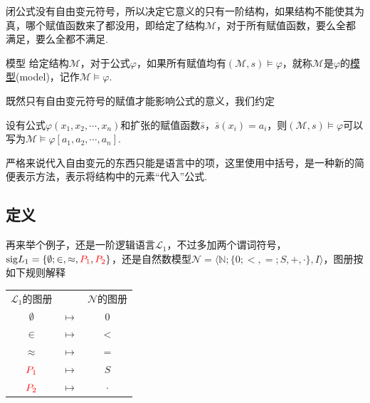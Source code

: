 闭公式没有自由变元符号，所以决定它意义的只有一阶结构，如果结构不能使其为真，哪个赋值函数来了都没用，即给定了结构\(\mathcal{M}\)，对于所有赋值函数，要么全都满足，要么全都不满足.

\begin{definition}{模型}
    给定结构\(\mathcal{M}\)，对于公式\(\varphi\)，如果所有赋值均有\((\mathcal{M}, s) \vDash \varphi\)，就称\(\mathcal{M}\)是\(\varphi\)的\underline{模型}(model)，记作\(\mathcal{M} \vDash \varphi\). 
\end{definition}

既然只有自由变元符号的赋值才能影响公式的意义，我们约定
\begin{reference}
    设有公式\(\varphi(x_1,x_2,\cdots,x_n)\)和扩张的赋值函数\(\bar s\)，\(\bar s(x_i)=a_i\)，则\((\mathcal{M},s) \vDash \varphi\)可以写为\(\mathcal{M} \vDash \varphi[a_1,a_2,\cdots,a_n]\).
\end{reference}
严格来说代入自由变元的东西只能是语言中的项，这里使用中括号，是一种新的简便表示方法，表示将结构中的元素“代入”公式. 

\subsection{定义}

再来举个例子，还是一阶逻辑语言\(\mathcal{L_1}\)，不过多加两个谓词符号，\({\rm sig}L_1 = \{\emptyset; \in, \approx, {\color{red}P_1}, {\color{red}P_2}\}\)，还是自然数模型\(\mathcal{N}=\langle \mathbb{N}; \{0; <, =; S, +, \cdot\}, I \rangle\)，图册按如下规则解释
\begin{center}
    \begin{tabular}{ccc}
        \(\mathcal{L}_1\)的图册 & & \(\mathcal{N}\)的图册 \\
        \(\emptyset\) & \(\longmapsto\) & \(0\) \\
        \(\in\) & \(\longmapsto\) & \(<\) \\
        \(\approx\) & \(\longmapsto\) & \(=\) \\
        \({\color{red} P_1}\) & \(\longmapsto\) & \(S\) \\
        \({\color{red} P_2}\) & \(\longmapsto\) & \(\cdot\) 
    \end{tabular}
\end{center}

